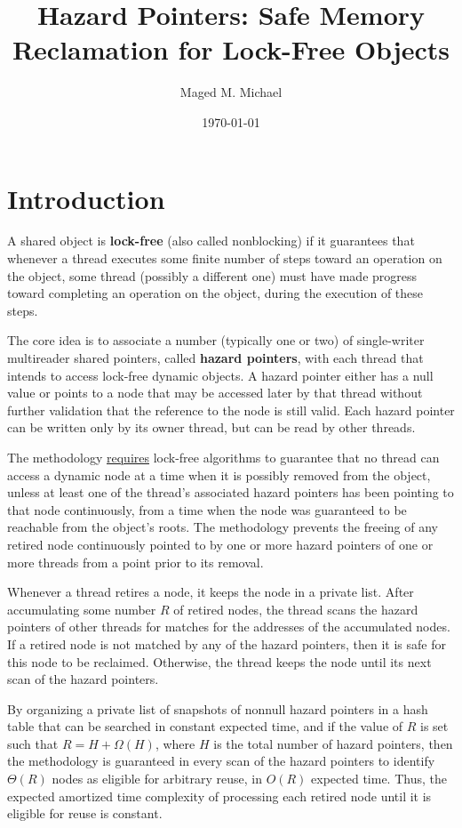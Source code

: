 \documentclass[11pt]{article}
\author{Maged M. Michael}
\date{\today}
\title{Hazard Pointers: Safe Memory Reclamation for Lock-Free Objects}
\begin{document}
\maketitle
\section{Introduction}
\label{sec:org851414b}
A shared object is \textbf{lock-free} (also called nonblocking) if it guarantees that whenever a thread
executes some finite number of steps toward an operation on the object, some thread (possibly a
different one) must have made progress toward completing an operation on the object, during the
execution of these steps.

The core idea is to associate a number (typically one or two) of single-writer multireader shared
pointers, called \textbf{hazard pointers}, with each thread that intends to access lock-free dynamic objects. A
hazard pointer either has a null value or points to a node that may be accessed later by that thread
without further validation that the reference to the node is still valid. Each hazard pointer can be
written only by its owner thread, but can be read by other threads.

The methodology \uline{requires} lock-free algorithms to guarantee that no thread can access a dynamic node at
a time when it is possibly removed from the object, unless at least one of the thread’s associated
hazard pointers has been pointing to that node continuously, from a time when the node was guaranteed
to be reachable from the object’s roots. The methodology prevents the freeing of any retired node
continuously pointed to by one or more hazard pointers of one or more threads from a point prior to
its removal.

Whenever a thread retires a node, it keeps the node in a private list. After accumulating some number
\(R\) of retired nodes, the thread scans the hazard pointers of other threads for matches for the
addresses of the accumulated nodes. If a retired node is not matched by any of the hazard pointers,
then it is safe for this node to be reclaimed. Otherwise, the thread keeps the node until its next
scan of the hazard pointers.

By organizing a private list of snapshots of nonnull hazard pointers in a hash table that can be
searched in constant expected time, and if the value of \(R\) is set such that \(R=H+\Omega(H)\),
where \(H\) is the total number of hazard pointers, then the methodology is guaranteed in every scan
of the hazard pointers to identify \(\Theta(R)\) nodes as eligible for arbitrary reuse, in \(O(R)\)
expected time. Thus, the expected amortized time complexity of processing each retired node until it is eligible for reuse is constant.
\end{document}
